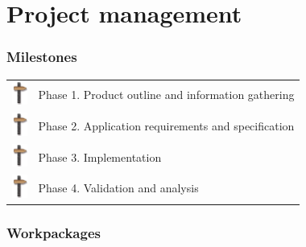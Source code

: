 \documentclass{beamer}
\theoremstyle{definition} \newtheorem{mdefinition}{Definition}
\theoremstyle{plain} \newtheorem{mtheorem}{Theorem}
\theoremstyle{plain} \newtheorem{mcorollary}{Corollary}
\theoremstyle{plain} \newtheorem{mfact}{Fact}
\begin{document}
\section{Project management}
\begin{frame}
	\frametitle{Milestones}

\begin{tabular}{ll}

\includegraphics[height=0.3in]{img/milestone_03} & Phase 1. Product outline and information gathering\\
\includegraphics[height=0.3in]{img/milestone_03} & Phase 2. Application requirements and specification\\
\includegraphics[height=0.3in]{img/milestone_03} & Phase 3. Implementation\\
\includegraphics[height=0.3in]{img/milestone_03} & Phase 4. Validation and analysis\\
\end{tabular}


\end{frame}

\begin{frame}
	\frametitle{Workpackages}
\end{frame}
\end{document}
